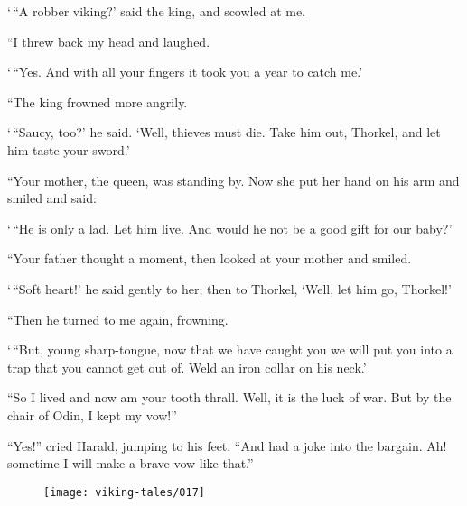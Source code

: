 `\,``A robber viking?' said the king, and scowled at me.

``I threw back my head and laughed.

`\,``Yes. And with all your fingers it took you a year to catch me.'

``The king frowned more angrily.

`\,``Saucy, too?' he said. `Well, thieves must die. Take him out, Thorkel,
and let him taste your sword.'

``Your mother, the queen, was standing by. Now she put her hand on his
arm and smiled and said:

`\,``He is only a lad. Let him live. And would he not be a good gift for
our baby?'

``Your father thought a moment, then looked at your mother and smiled.

`\,``Soft heart!' he said gently to her; then to Thorkel, `Well, let him
go, Thorkel!'

``Then he turned to me again, frowning.

`\,``But, young sharp-tongue, now that we have caught you we will put you
into a trap that you cannot get out of. Weld an iron collar on his
neck.'

``So I lived and now am your tooth thrall. Well, it is the luck of war.
But by the chair of Odin, I kept my vow!''

``Yes!'' cried Harald, jumping to his feet. ``And had a joke into the
bargain. Ah! sometime I will make a brave vow like that.''

\begin{figure}[hb]
    \centering
    \vskip8pt
    \texttt{[image: viking-tales/017]}
\end{figure}
